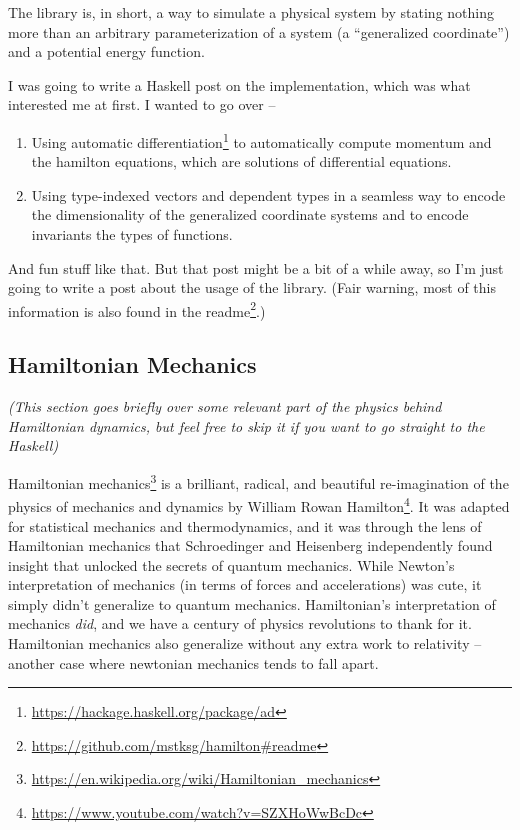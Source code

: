 \documentclass[]{article}
\renewcommand{\href}[2]{#2\footnote{\url{#1}}}
\begin{document}
The library is, in short, a way to simulate a physical system by stating nothing
more than an arbitrary parameterization of a system (a ``generalized
coordinate'') and a potential energy function.

I was going to write a Haskell post on the implementation, which was what
interested me at first. I wanted to go over --

\begin{enumerate}
\def\labelenumi{\arabic{enumi}.}
\item
  Using \href{https://hackage.haskell.org/package/ad}{automatic differentiation}
  to automatically compute momentum and the hamilton equations, which are
  solutions of differential equations.
\item
  Using type-indexed vectors and dependent types in a seamless way to encode the
  dimensionality of the generalized coordinate systems and to encode invariants
  the types of functions.
\end{enumerate}

And fun stuff like that. But that post might be a bit of a while away, so I'm
just going to write a post about the usage of the library. (Fair warning, most
of this information is also found in the
\href{https://github.com/mstksg/hamilton\#readme}{readme}.)

\subsection{Hamiltonian Mechanics}\label{hamiltonian-mechanics}

\emph{(This section goes briefly over some relevant part of the physics behind
Hamiltonian dynamics, but feel free to skip it if you want to go straight to the
Haskell)}

\href{https://en.wikipedia.org/wiki/Hamiltonian_mechanics}{Hamiltonian
mechanics} is a brilliant, radical, and beautiful re-imagination of the physics
of mechanics and dynamics by
\href{https://www.youtube.com/watch?v=SZXHoWwBcDc}{William Rowan Hamilton}. It
was adapted for statistical mechanics and thermodynamics, and it was through the
lens of Hamiltonian mechanics that Schroedinger and Heisenberg independently
found insight that unlocked the secrets of quantum mechanics. While Newton's
interpretation of mechanics (in terms of forces and accelerations) was cute, it
simply didn't generalize to quantum mechanics. Hamiltonian's interpretation of
mechanics \emph{did}, and we have a century of physics revolutions to thank for
it. Hamiltonian mechanics also generalize without any extra work to relativity
-- another case where newtonian mechanics tends to fall apart.
\end{document}
